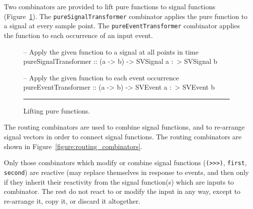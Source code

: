 \documentclass[draft]{llncs}
\begin{document}
Two combinators are provided to lift pure functions to signal functions
(Figure~\ref{figure:lifting_pure_functions}). The {\tt pureSignalTransformer}
combinator applies the pure function to a signal at every sample point. The
{\tt pureEventTransformer} combinator applies the function to each occurrence of
an input event.

\begin{figure}
\begin{code}
-- Apply the given function to a signal at all points in time
pureSignalTransformer :: (a -> b) -> SVSignal a :~> SVSignal b

-- Apply the given function to each event occurrence
pureEventTransformer  :: (a -> b) -> SVEvent a :~> SVEvent b
\end{code}
\hrule
\caption{Lifting pure functions.}
\label{figure:lifting_pure_functions}
\end{figure}

The routing combinators are used to combine signal functions, and
to re-arrange signal vectors in order to connect signal functions.
The routing combinators are shown in Figure~\ref{figure:routing_combinators}.

Only those combinators which modify or combine signal functions
({\tt (>>>)}, {\tt first}, {\tt second}) are reactive (may replace themselves in
response to events, and then only if they inherit their reactivity from the
signal function(s) which are inputs to combinator. The rest do not
react to or modify the input in any way, except to re-arrange it, copy it, or
discard it altogether.
\end{document}

